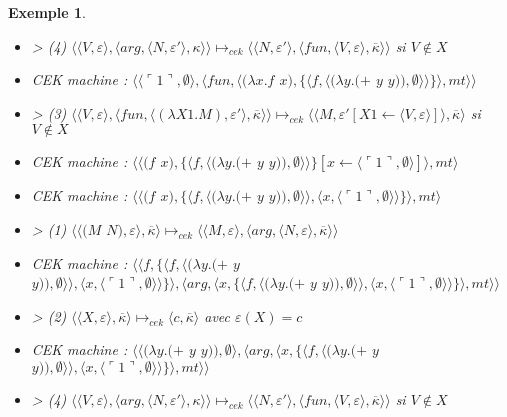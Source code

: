 \documentclass[10pt,a4paper]{report}
\newtheorem{ex}{Exemple}
\begin{document}
\begin{ex}
\begin{itemize}
			\item[] > (4) $\langle \langle V,\varepsilon\rangle,\langle arg,\langle N,\varepsilon'\rangle,\kappa\rangle\rangle \longmapsto_{cek} \langle \langle N,\varepsilon'\rangle,\langle fun,\langle V,\varepsilon\rangle,\overline{\kappa}\rangle\rangle$ si $V \notin X$
			\item[] CEK machine : $\langle\langle\ulcorner 1\urcorner,\emptyset\rangle,\langle fun,\langle(\lambda x.f$ $x),\{\langle f,\langle(\lambda y.(+$ $y$ $y)),\emptyset\rangle\rangle\}\rangle,mt\rangle\rangle$
			\item[] > (3) $\langle\langle V,\varepsilon\rangle,\langle fun,\langle (\lambda X1.M),\varepsilon'\rangle,\overline{\kappa} \rangle \rangle \longmapsto_{cek} \langle \langle M,\varepsilon'[X1 \leftarrow \langle V,\varepsilon\rangle]\rangle,\overline{\kappa}\rangle$ si $V \notin X$
			\item[] CEK machine : $\langle\langle(f$ $x),\{\langle f,\langle(\lambda y.(+$ $y$ $y)),\emptyset\rangle\rangle\}[x \leftarrow \langle\ulcorner 1\urcorner,\emptyset\rangle]\rangle,mt\rangle$
			\item[] CEK machine : $\langle\langle(f$ $x),\{\langle f,\langle(\lambda y.(+$ $y$ $y)),\emptyset\rangle\rangle,\langle x,\langle\ulcorner 1\urcorner,\emptyset\rangle\rangle\}\rangle,mt\rangle$
			\item[] > (1) $\langle\langle(M$ $N),\varepsilon\rangle,\overline{\kappa}\rangle \longmapsto_{cek} \langle \langle M,\varepsilon\rangle,\langle arg,\langle N,\varepsilon\rangle,\overline{\kappa}\rangle\rangle$
			\item[] CEK machine : $\langle\langle f,\{\langle f,\langle(\lambda y.(+$ $y$ $y)),\emptyset\rangle\rangle,\langle x,\langle\ulcorner 1\urcorner,\emptyset\rangle\rangle\}\rangle,\langle arg,\langle x,\{\langle f,\langle(\lambda y.(+$ $y$ $y)),\emptyset\rangle\rangle,\langle x,\langle\ulcorner 1\urcorner,\emptyset\rangle\rangle\}\rangle,mt\rangle\rangle$
			\item[] > (2) $\langle\langle X,\varepsilon\rangle,\overline{\kappa}\rangle \longmapsto_{cek} \langle c,\overline{\kappa}\rangle$ avec $\varepsilon(X) = c$
			\item[] CEK machine : $\langle\langle(\lambda y.(+$ $y$ $y)),\emptyset\rangle,\langle arg,\langle x,\{\langle f,\langle(\lambda y.(+$ $y$ $y)),\emptyset\rangle\rangle,\langle x,\langle\ulcorner 1\urcorner,\emptyset\rangle\rangle\}\rangle,mt\rangle\rangle$
			\item[] > (4) $\langle \langle V,\varepsilon\rangle,\langle arg,\langle N,\varepsilon'\rangle,\kappa\rangle\rangle \longmapsto_{cek} \langle \langle N,\varepsilon'\rangle,\langle fun,\langle V,\varepsilon\rangle,\overline{\kappa}\rangle\rangle$ si $V \notin X$

\end{itemize}
\end{ex}
\end{document}
